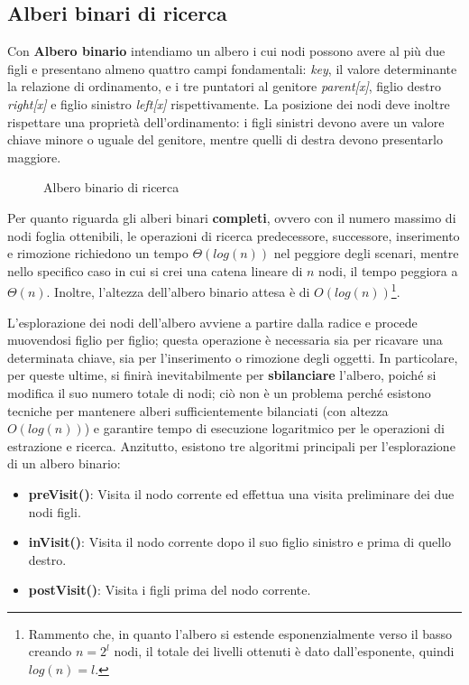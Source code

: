 \subsection{Alberi binari di ricerca}
Con \textbf{Albero binario} intendiamo un albero i cui nodi possono avere al più due figli e presentano almeno quattro campi fondamentali: \textit{key},
il valore determinante la relazione di ordinamento, e i tre puntatori al genitore \textit{parent[x]}, figlio destro \textit{right[x]} e figlio sinistro
\textit{left[x]} rispettivamente. La posizione dei nodi deve inoltre rispettare una proprietà dell'ordinamento: i figli sinistri devono avere un valore
chiave minore o uguale del genitore, mentre quelli di destra devono presentarlo maggiore.

\begin{figure}[h]
	\centering
	\caption{Albero binario di ricerca}
\end{figure}

\noindent Per quanto riguarda gli alberi binari \textbf{completi}, ovvero con il numero massimo di nodi foglia ottenibili, le operazioni di ricerca
predecessore, successore, inserimento e rimozione richiedono un tempo $\Theta(log(n))$ nel peggiore degli scenari, mentre nello specifico caso in cui si
crei una catena lineare di $n$ nodi, il tempo peggiora a $\Theta(n)$. Inoltre, l'altezza dell'albero binario attesa è di $O(log(n))$\footnote{Rammento
che, in quanto l'albero si estende esponenzialmente verso il basso creando $n = 2^l$ nodi, il totale dei livelli ottenuti è dato dall'esponente, quindi
$log(n) = l$.}.\par
L'esplorazione dei nodi dell'albero avviene a partire dalla radice e procede muovendosi figlio per figlio; questa operazione è necessaria sia per
ricavare una determinata chiave, sia per l'inserimento o rimozione degli oggetti. In particolare, per queste ultime, si finirà inevitabilmente per
\textbf{sbilanciare} l'albero, poiché si modifica il suo numero totale di nodi; ciò non è un problema perché esistono tecniche per mantenere alberi
sufficientemente bilanciati (con altezza $O(log(n))$) e garantire tempo di esecuzione logaritmico per le operazioni di estrazione e ricerca. Anzitutto,
esistono tre algoritmi principali per l'esplorazione di un albero binario: \begin{itemize}
	\item \textbf{preVisit()}: Visita il nodo corrente ed effettua una visita preliminare dei due nodi figli.
	\item \textbf{inVisit()}: Visita il nodo corrente dopo il suo figlio sinistro e prima di quello destro.
	\item \textbf{postVisit()}: Visita i figli prima del nodo corrente.
\end{itemize}

